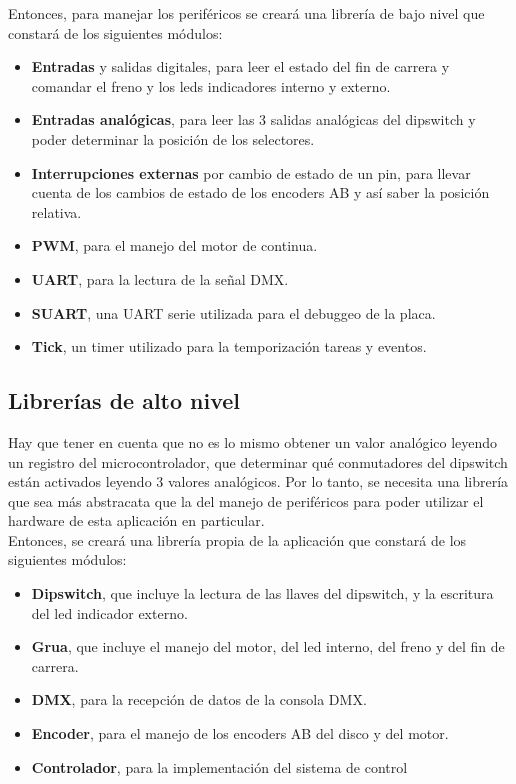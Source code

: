 Entonces, para manejar los periféricos se creará una librería de bajo nivel que constará de los siguientes módulos:
\begin{itemize}
	\item \textbf{Entradas} y salidas digitales, para leer el estado del fin de carrera y comandar el freno y los leds indicadores interno y externo.
	\item \textbf{Entradas analógicas}, para leer las 3 salidas analógicas del dipswitch y poder determinar la posición de los selectores.
	\item \textbf{Interrupciones externas} por cambio de estado de un pin, para llevar cuenta de los cambios de estado de los encoders AB y así saber la posición relativa.
	\item \textbf{PWM}, para el manejo del motor de continua.
	\item \textbf{UART}, para la lectura de la señal DMX.
	\item \textbf{SUART}, una UART serie utilizada para el debuggeo de la placa.
	\item \textbf{Tick}, un timer utilizado para la temporización tareas y eventos.
\end{itemize}

\subsection{Librerías de alto nivel}
Hay que tener en cuenta que no es lo mismo obtener un valor analógico leyendo un registro del microcontrolador, que determinar qué conmutadores del dipswitch están activados leyendo 3 valores analógicos. Por lo tanto, se necesita una librería que sea más abstracata que la del manejo de periféricos para poder utilizar el hardware de esta aplicación en particular.\\
Entonces, se creará una librería propia de la aplicación que constará de los siguientes módulos:
\begin{itemize}
	\item \textbf{Dipswitch}, que incluye la lectura de las llaves del dipswitch, y la escritura del led indicador externo.
	\item \textbf{Grua}, que incluye el manejo del motor, del led interno, del freno y del fin de carrera.
	\item \textbf{DMX}, para la recepción de datos de la consola DMX.
	\item \textbf{Encoder}, para el manejo de los encoders AB del disco y del motor.
	\item \textbf{Controlador}, para la implementación del sistema de control
\end{itemize}

